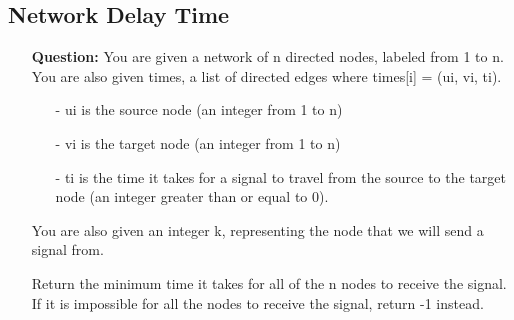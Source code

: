 \documentclass[12pt]{article}
\begin{document}
\subsection{Network Delay Time}
\begin{enumerate}
  \item[] \textbf{Question:} You are given a network of n directed nodes, labeled from 1 to n. You are also given times, a list of directed edges where times[i] = (ui, vi, ti).

\begin{enumerate}
  \item[-] ui is the source node (an integer from 1 to n)
  \item[-] vi is the target node (an integer from 1 to n)
  \item[-] ti is the time it takes for a signal to travel from the source to the target node (an integer greater than or equal to 0).

\end{enumerate}
You are also given an integer k, representing the node that we will send a signal from.

Return the minimum time it takes for all of the n nodes to receive the signal. If it is impossible for all the nodes to receive the signal, return -1 instead.


\end{enumerate}
\end{document}
